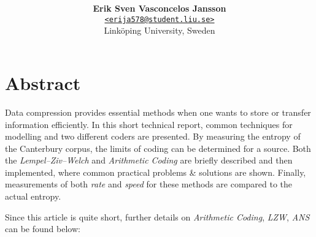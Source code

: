 \documentclass[a4paper, twocolumn]{article}
\title{\textbf{\makebox[\linewidth][s]{Implementing Several Lossless Compression Algorithms:}
             \\\makebox[\linewidth][s]{Adaptive Arithmetic Coding (AC) and the LZW for \CC}}}
\author{{\textbf{Erik Sven Vasconcelos Jansson}} \\
        {\href{mailto:erija578@student.liu.se}
        {\texttt{<erija578@student.liu.se>}}} \\
        {Linköping University, Sweden}}
\begin{document}
    \maketitle

    \section*{Abstract}

    Data compression provides essential methods when one wants to store or transfer information efficiently. In this short technical report, common techniques for modelling and two different coders are presented. By measuring the entropy of the Canterbury corpus, the limits of coding can be determined for a source. Both the \emph{Lempel--Ziv--Welch} and \emph{Arithmetic Coding} are briefly described and then implemented, where common practical problems \& solutions are shown. Finally, measurements of both \emph{rate} and \emph{speed} for these methods are compared to the actual entropy.

    \vspace{-0.1in}
    \tableofcontents
    \newpage

    Since this article is quite short, further details on \emph{Arithmetic Coding}, \emph{LZW}, \emph{ANS} can be found below:

    \nocite{*} %
    
    
\end{document}
